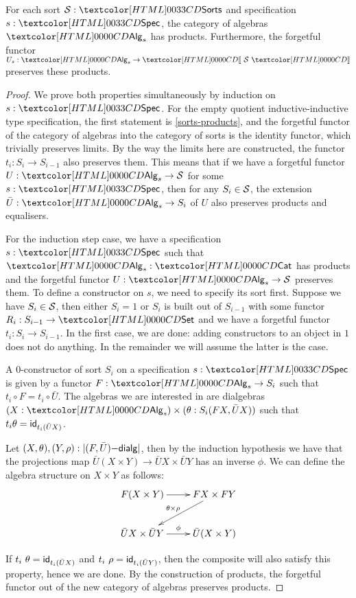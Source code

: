 \begin{lemma}
  For each sort $\Ss : \sortsty$ and specification $s : \specty$, the
  category of algebras $\Alg_s$ has products. Furthermore, the
  forgetful functor $U_s : \Alg_s \to \SortCat{\Ss}$ preserves these products.
\end{lemma}
\begin{proof}
  We prove both properties simultaneously by induction on
  $s : \specty$.  For the empty quotient inductive-inductive type
  specification, the first statement is \cref{sorts-products}, and the
  forgetful functor of the category of algebras into the category of
  sorts is the identity functor, which trivially preserves limits. By
  the way the limits here are constructed, the functor
  $t_i : S_i \to S_{i-1}$ also preserves them. This means that if we
  have a forgetful functor $U : \Alg_s \to \Ss$ for some
  $s : \specty$, then for any $S_i \in \mathcal{S}$, the extension
  $\bar{U} : \Alg_s \to S_i$ of $U$ also preserves products and
  equalisers.

  For the induction step case, we have a specification $s : \specty$
  such that $\Alg_s : \Cat$ has products and the forgetful functor
  $U : \Alg_s \to \Ss$ preserves them. To define a constructor on $s$,
  we need to specify its sort first. Suppose we have $S_i \in \mathcal{S}$,
  then either $S_i = 1$ or $S_i$ is built out of $S_{i-1}$ with some
  functor $R_i : S_{i-1} \to \Set$ and we have a forgetful functor
  $t_i : S_i \to S_{i-1}$. In the first case, we are done: adding
  constructors to an object in $1$ does not do anything. In the
  remainder we will assume the latter is the case.

  A 0-constructor of sort $S_i$ on a specification $s : \specty$ is
  given by a functor $F : \Alg_s \to S_i$ such that
  $t_i \circ F = t_i \circ \bar{U}$. The algebras we are interested in
  are dialgebras $(X : \Alg_s) \times (\theta : S_i(FX, \bar{U}X))$
  such that $t_i \theta = \mathsf{id}_{t_i (\bar{U}X)}$.

  Let $(X,\theta), (Y,\rho) : | (F,\bar{U})\mathsf{-dialg} |$, then by the
  induction hypothesis we have that the projections map
  $\bar{U}(X \times Y) \to \bar{U}X \times \bar{U}Y$ has an inverse
  $\phi$. We can define the algebra structure on $X \times Y$ as
  follows:
  $$
  \xymatrix{ F(X \times Y) \ar[r] &
    FX \times FY \ar[ld]_{\theta \times \rho} \\
    \bar{U}X \times \bar{U}Y \ar[r]^{\phi} & \bar{U}(X \times Y) }
  $$

  If $t_i\ \theta = \mathsf{id}_{t_i (\bar{U}X)}$ and
  $t_i\ \rho = \mathsf{id}_{t_i (\bar{U}Y)}$, then the composite will also
  satisfy this property, hence we are done. By the construction of
  products, the forgetful functor out of the new category of algebras
  preserves products.
\end{proof}



